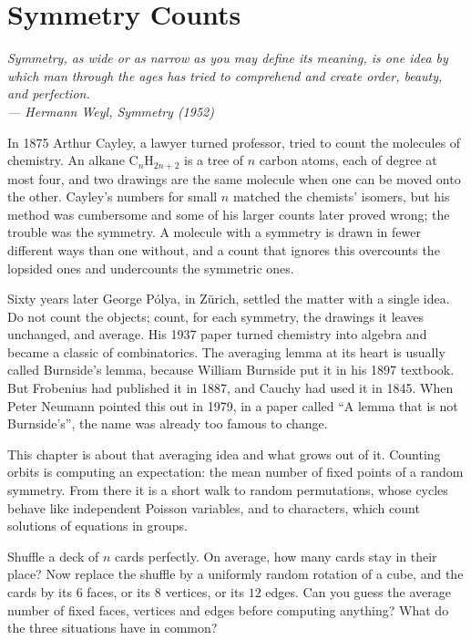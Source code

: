 \chapter{Symmetry Counts}

\begin{center}\itshape
Symmetry, as wide or as narrow as you may define its meaning, is one idea by which man through the ages has tried to
comprehend and create order, beauty, and perfection.\\
\upshape --- Hermann Weyl, \emph{Symmetry} (1952)
\end{center}

In 1875 Arthur Cayley, a lawyer turned professor, tried to count the molecules of chemistry. An alkane $\mathrm C_n\mathrm H_{2n+2}$
is a tree of $n$ carbon atoms, each of degree at most four, and two drawings are the same molecule when one can be moved onto
the other. Cayley's numbers for small $n$ matched the chemists' isomers, but his method was cumbersome and some of his larger counts
later proved wrong; the trouble was the symmetry. A molecule with a symmetry is drawn in fewer different ways than
one without, and a count that ignores this overcounts the lopsided ones and undercounts the symmetric ones.

Sixty years later George Pólya, in Zürich, settled the matter with a single idea. Do not count the objects; count, for each
symmetry, the drawings it leaves unchanged, and average. His 1937 paper turned chemistry into algebra and became a classic
of combinatorics. The averaging lemma at its heart is usually called Burnside's lemma, because William
Burnside put it in his 1897 textbook. But Frobenius had published it in 1887, and Cauchy had used it in 1845. When Peter
Neumann pointed this out in 1979, in a paper called ``A lemma that is not Burnside's'', the name was already too famous to
change.

This chapter is about that averaging idea and what grows out of it. Counting orbits is computing an expectation: the mean
number of fixed points of a random symmetry. From there it is a short walk to random permutations, whose cycles behave like
independent Poisson variables, and to characters, which count solutions of equations in groups.

\begin{think}
Shuffle a deck of $n$ cards perfectly. On average, how many cards stay in their place? Now replace the shuffle by a uniformly
random rotation of a cube, and the cards by its $6$ faces, or its $8$ vertices, or its $12$ edges. Can you guess the average
number of fixed faces, vertices and edges before computing anything? What do the three situations have in common?
\end{think}

